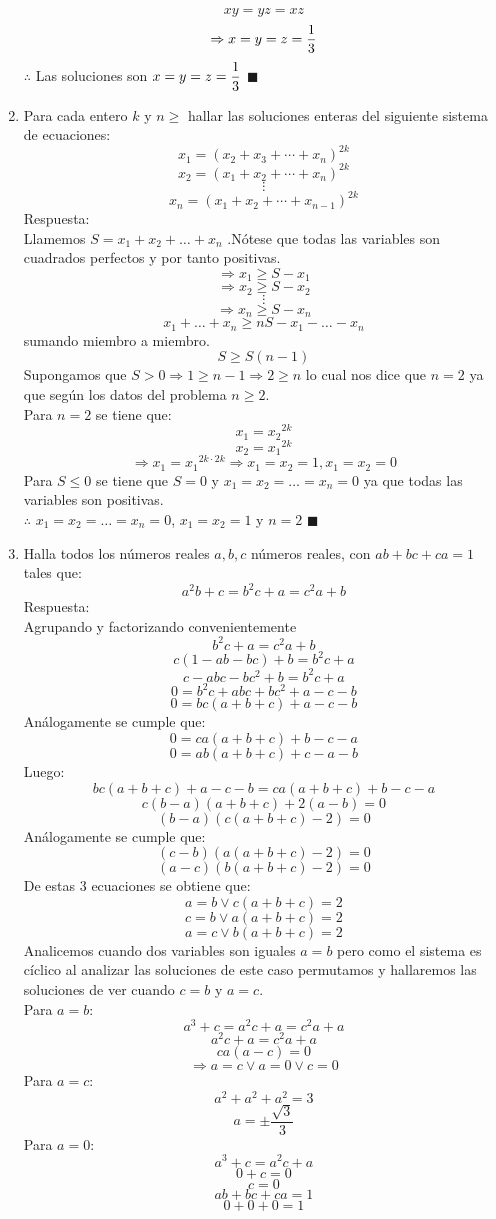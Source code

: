 \documentclass{book}
\begin{document}
\begin{enumerate}
$$xy=yz=xz$$
$$\Rightarrow x=y=z={1\over 3}$$
$\therefore$ Las soluciones son $\displaystyle{x=y=z={1\over 3}}$ $\blacksquare$\\
				\item Para cada entero $k$ y $n\geq$  hallar las soluciones enteras del siguiente sistema de ecuaciones: 
				$$x_1={(x_2+x_3+\cdots+x_n)}^{2k}$$
				$$x_2={(x_1+x_2+\cdots+x_n)}^{2k}$$
				$$\vdots$$
				$$x_n={(x_1+x_2+\cdots+x_{n-1})}^{2k}$$
				Respuesta:\\
				Llamemos  $S=x_1+x_2+\ldots+x_n$ .Nótese que todas las variables son cuadrados perfectos y por tanto positivas.
$$\Rightarrow x_1\geq S-x_1$$
$$\Rightarrow x_2\geq S-x_2$$
$$\vdots$$
$$\Rightarrow x_n\geq S-x_n$$
$$x_1+\ldots+x_n\geq nS-x_1-\ldots-x_n$$ sumando miembro a miembro.
$$S\geq S(n-1)$$
Supongamos que  $S> 0 \Rightarrow  1\geq n-1 \Rightarrow  2\geq n $ lo cual nos dice que $n=2$ ya que según los datos del problema $n\geq 2$.\\
Para $n=2$ se tiene que:
$$x_1={x_2}^{2k}$$
$$x_2={x_1}^{2k}$$
$$\Rightarrow x_1={x_1}^{2k\cdot 2k}\Rightarrow  x_1=x_2=1,x_1=x_2=0$$
Para $S\leq 0$ se tiene que $S=0$ y $x_1=x_2=\ldots=x_n=0$ ya que todas las variables son positivas.\\
$\therefore$ $x_1=x_2=\ldots=x_n=0$, $x_1=x_2=1$ y $n=2$ $\blacksquare$\\
				\item Halla todos los números reales $a,b,c$ números reales, con $ab+bc+ca=1$ tales que: 
				$$a^2b+c=b^2c+a=c^2a+b$$
				Respuesta:\\
				Agrupando y factorizando convenientemente
				$$b^2 c+a=c^2 a+b$$
$$c(1-ab-bc)+b=b^2 c+a$$
$$c-abc-bc^2+b=b^2 c+a$$
$$0=b^2 c+abc+bc^2+a-c-b$$
$$0=bc(a+b+c)+a-c-b$$
Análogamente se cumple que:
$$0=ca(a+b+c)+b-c-a$$
$$0=ab(a+b+c)+c-a-b$$
Luego:
	$$bc(a+b+c)+a-c-b=ca(a+b+c)+b-c-a$$
$$c(b-a)(a+b+c)+2(a-b)=0$$
$$(b-a)(c(a+b+c)-2)=0$$
Análogamente se cumple que:
$$(c-b)(a(a+b+c)-2)=0$$
$$(a-c)(b(a+b+c)-2)=0$$
De estas 3 ecuaciones se obtiene que:
$$a=b \vee c(a+b+c)=2$$
$$c=b \vee a(a+b+c)=2$$
$$a=c \vee b(a+b+c)=2$$
Analicemos cuando dos variables son iguales $a=b$ pero como el sistema es cíclico al analizar las soluciones de este caso permutamos y hallaremos las soluciones de ver cuando $c=b$ y $a=c$.\\
Para $a=b$:
$$a^3+c=a^2 c+a=c^2 a+a$$
$$a^2 c+a=c^2 a+a$$
$$ca(a-c)=0$$
$$\Rightarrow a=c \vee a=0 \vee c=0$$
Para $a=c$:
$$a^2+a^2+a^2=3$$
$$a=\pm\frac{\sqrt{3}}{3}$$
Para $a=0$:
$$a^3+c=a^2 c+a$$
$$0+c=0$$
$$c=0$$
$$ab+bc+ca=1$$
$$0+0+0=1$$

\end{enumerate}
\end{document}
